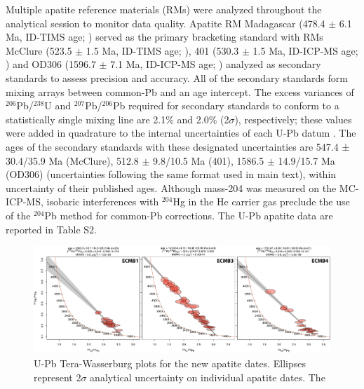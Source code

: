 \documentclass[11pt,letterpaper]{article}
\begin{document}
Multiple apatite reference materials (RMs) were analyzed throughout the analytical session to monitor data quality. Apatite RM Madagascar (478.4 $\pm$ 6.1 Ma, ID-TIMS age; \citealp{Thomson2012a}) served as the primary bracketing standard with RMs McClure (523.5 $\pm$ 1.5 Ma, ID-TIMS age; \citealp{Schoene2006a}), 401 (530.3 $\pm$ 1.5 Ma, ID-ICP-MS age; \citealp{Thompson2016a}) and OD306 (1596.7 $\pm$ 7.1 Ma, ID-ICP-MS age; \citealp{Thompson2016a}) analyzed as secondary standards to assess precision and accuracy. All of the secondary standards form mixing arrays between common-Pb and an age intercept. The excess variances of $^{206}$Pb/$^{238}$U and $^{207}$Pb/$^{206}$Pb required for secondary standards to conform to a statistically single mixing line are 2.1$\%$ and 2.0$\%$ (2$\sigma$), respectively; these values were added in quadrature to the internal uncertainties of each U-Pb datum \citep{Horstwood2016a}. The ages of the secondary standards with these designated uncertainties are 547.4 ± 30.4/35.9 Ma (McClure), 512.8 $\pm$ 9.8/10.5 Ma (401), 1586.5 $\pm$ 14.9/15.7 Ma (OD306) (uncertainties following the same format used in main text), within uncertainty of their published ages. Although mass-204 was measured on the MC-ICP-MS, isobaric interferences with $^{204}$Hg in the He carrier gas preclude the use of the $^{204}$Pb method for common-Pb corrections. The U-Pb apatite data are reported in Table S2.


\begin{figure}[!ht]
\noindent\includegraphics[width=\textwidth]{./figures/SI_apatite_TW.pdf}
\centering
\caption{\small{U-Pb Tera-Wasserburg plots for the new apatite dates. Ellipses represent 2$\sigma$ analytical uncertainty on individual apatite dates. The }}
\label{fig:apatite_TW}
\end{figure}



\clearpage
\pagebreak
\singlespacing
\end{document}
